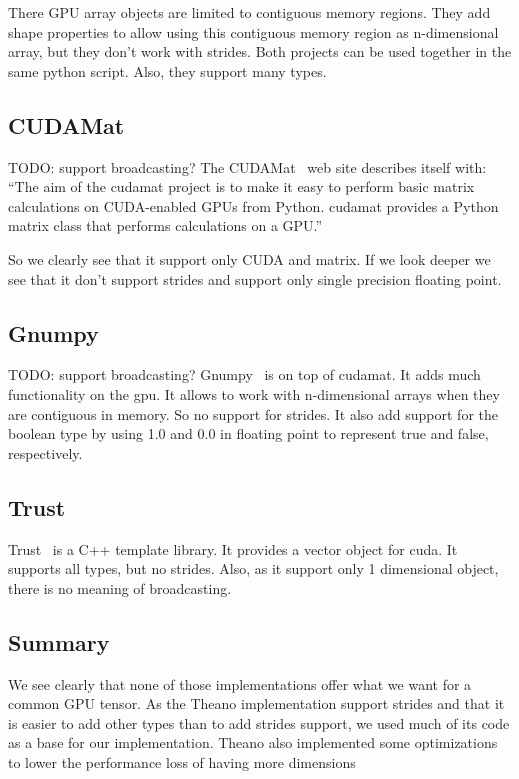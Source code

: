 \documentclass{article} %
\begin{document}
There GPU array objects are limited to contiguous memory regions. They add shape properties to allow using this contiguous memory region as n-dimensional array, but they don't work with strides. Both projects can be used together in the same python script. Also, they support many types.

\subsection{CUDAMat}
TODO: support broadcasting?
The CUDAMat~\citep{cudamat-TR2009} web site describes itself with: ``The aim of the cudamat project is to make it easy to perform basic matrix calculations on CUDA-enabled GPUs from Python. cudamat provides a Python matrix class that performs calculations on a GPU.''

So we clearly see that it support only CUDA and matrix. If we look deeper we see that it don't support strides and support only single precision floating point.

\subsection{Gnumpy}
TODO: support broadcasting?
Gnumpy~\citep{gnumpy-TR2010} is on top of cudamat. It adds much functionality on the gpu. It allows to work with n-dimensional arrays when they are contiguous in memory. So no support for strides. It also add support for the boolean type by using 1.0 and 0.0 in floating point to represent true and false, respectively.

\subsection{Trust}
Trust~\citep{Thrust} is a C++ template library. It provides a vector object for cuda. It supports all types, but no strides. Also, as it support only 1 dimensional object, there is no meaning of broadcasting.

\subsection{Summary}
We see clearly that none of those implementations offer what we want for a common GPU tensor. As the Theano implementation support strides and that it is easier to add other types than to add strides support, we used much of its code as a base for our implementation. Theano also implemented some optimizations to lower the performance loss of having more dimensions
\end{document}
